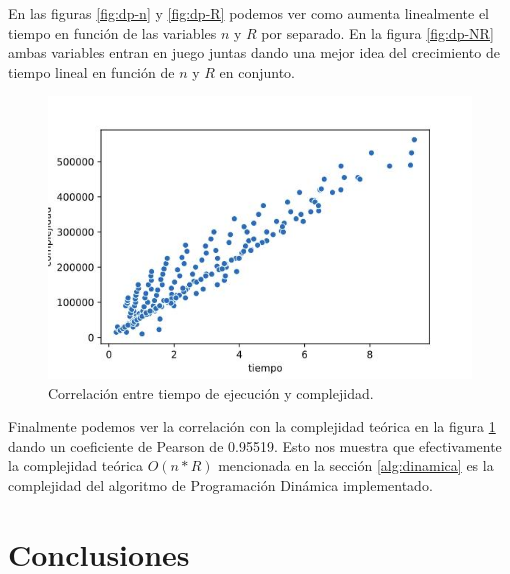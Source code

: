 \documentclass[10pt,a4paper]{article}
\begin{document}
En las figuras \ref{fig:dp-n} y \ref{fig:dp-R} podemos ver como aumenta linealmente el tiempo en función de las variables $n$ y $R$ por separado. En la figura \ref{fig:dp-NR} ambas variables entran en juego juntas dando una mejor idea del crecimiento de tiempo lineal en función de $n$ y $R$ en conjunto.
\newline
\begin{figure}[h!]
	\centering
	\includegraphics[scale=0.35]{img/dp-correlacion.jpg}
	\caption{Correlación entre tiempo de ejecución y complejidad.}
	\label{fig:dp-complejidad}
\end{figure}
\newline
Finalmente podemos ver la correlación con la complejidad teórica en la figura \ref{fig:dp-complejidad} dando un coeficiente de Pearson\cite{ref:pearson} de 0.95519. Esto nos muestra que efectivamente la complejidad teórica $O(n*R)$ mencionada en la sección \ref{alg:dinamica} es la complejidad del algoritmo de Programación Dinámica implementado.
\newpage

\section{Conclusiones} \label{sec:conclusiones}

\newpage
\nocite{*}
\end{document}

